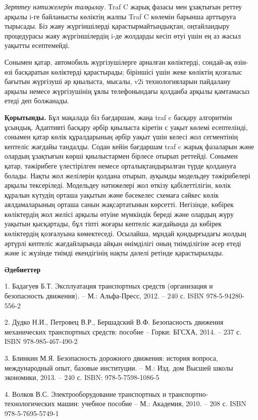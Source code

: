 \emph{Зерттеу нәтижелерін талқылау.} Тraf C жарық фазасы мен ұзақтығын
реттеу арқылы i-ге байланысты көліктің жалпы Traf C көлемін барынша
арттыруға тырысады. Біз жаяу жүргіншілерді қарастырмайтындықтан,
оңтайландыру процедурасы жаяу жүргіншілердің i-де жолдарды кесіп өтуі
үшін ең аз жасыл уақытты есептемейді.

Сонымен қатар, автомобиль жүргізушілерге арналған көліктерді, сондай-ақ
өзін-өзі басқаратын көліктерді қарастырады; біріншісі үшін жеке көліктің
қозғалыс бағытын жүргізуші әр қиылыста, мысалы, v2i технологияларын
пайдалану арқылы немесе жүргізушінің ұялы телефонындағы қолданба арқылы
қамтамасыз етеді деп болжанады.

{\bfseries Қорытынды.} Бұл мақалада біз бағдаршам, жаңа traf c басқару
алгоритмін ұсындық. Адаптивті басқару әрбір қиылыста кіретін с уақыт
көлемі есептелінді, сонымен қатар көлік құралдарының әрбір уақыт үшін
келесі жол сегментінің кептеліс жағдайы тандалды. Содан кейін бағдаршам
traf c жарық фазаларын және олардың ұзақтығын көрші қиылыстармен бірлесе
отырып реттейді. Сонымен қатар, тәжірибеге үлестірілген немесе
орталықтандырылған түрде қолдануға болады. Нақты жол желілерін қолдана
отырып, ауқымды модельдеу тәжірибелері арқылы тексеріледі. Модельдеу
нәтижелері жол өткізу қабілеттілігін, көлік құралын күтудің орташа
уақытын және бәсекелес схемаға сәйкес көлік аялдамаларының орташа санын
жақсартатынын көрсетті. Негізінде, көбірек көліктердің жол желісі арқылы
өтуіне мүмкіндік береді және олардың жүру уақытын қысқартады, бұл тіпті
жоғары кептеліс жағдайында да көбірек көліктердің қозғалуына
көмектеседі. Осылайша, мұндай қондырғыдағы жолдың әртүрлі кептеліс
жағдайларында айқын өнімділігі оның тиімділігіне әсер етеді және іс
жүзінде тиімді екендігінің нақты дәлелі ретінде қарастырылады.

{\bfseries Әдебиеттер}

1. Бадагуев Б.Т. Эксплуатация транспортных средств (организация и
безопасность движения). -- М.: Альфа-Пресс, 2012. -- 240 с. ISBN
978-5-94280-556-2

2. Дудко Н.И., Петровец В.Р., Бершадский В.Ф. Безопасность движения
механических транспортных средств: пособие -- Горки: БГСХА, 2014. -- 237
с. ISBN 978-985-467-490-2

3. Блинкин М.Я. Безопасность дорожного движения: история вопроса,
международный опыт, базовые институции. -- М.: Изд. дом Высшей школы
экономики, 2013. -- 240 с. ISBN: 978-5-7598-1086-5

4. Волков В.С. Электрооборудование транспортных и
транспортно-технологических машин: учебное пособие -- М.: Академия,
2010. -- 208 с. ISBN 978-5-7695-5749-1

